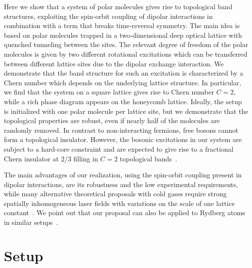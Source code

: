 Here we show that a system of polar molecules gives rise to topological band structures, exploiting the spin-orbit coupling of dipolar interactions in combination with a term that breaks time-reversal symmetry.
The main idea is based on polar molecules trapped in a two-dimensional deep optical lattice with quenched tunneling between the sites.
The relevant degree of freedom of the polar molecules is given by two different rotational excitations which can be transferred between different lattice sites due to the dipolar exchange interaction.
We demonstrate that the band structure for such an excitation is characterized by a Chern number which depends on the underlying lattice structure.
In particular, we find that the system on a square lattice gives rise to Chern number $C=2$, while a rich phase diagram appears on the honeycomb lattice. %
Ideally, the setup is initialized with one polar molecule per lattice site, but we demonstrate that the topological properties are robust, even if nearly half of the molecules are randomly removed.
In contrast to non-interacting fermions, free bosons cannot form a topological insulator. However,
the bosonic excitations in our system are subject to a hard-core constraint and are expected to give rise to a fractional Chern insulator at $2/3$ filling in $C=2$ topological bands~\cite{Moller2009,Wang2012a,Sterdyniak2015}.

The main advantages of our realization, using the spin-orbit coupling present in dipolar interactions, are its robustness and the low experimental requirements, while many alternative theoretical proposals with cold gases require strong spatially inhomogeneous laser fields with variations on the scale of one lattice constant~\cite{Liu2010,Stanescu2010,Goldman2013,Li2008,Yao2012,Yao2013,Goldman2013,Jaksch2003}.
We point out that our proposal can also be applied to Rydberg atoms in similar setups~\cite{Barredo2014,Piotrowicz2013,Nogrette2014}.

\section{Setup}

